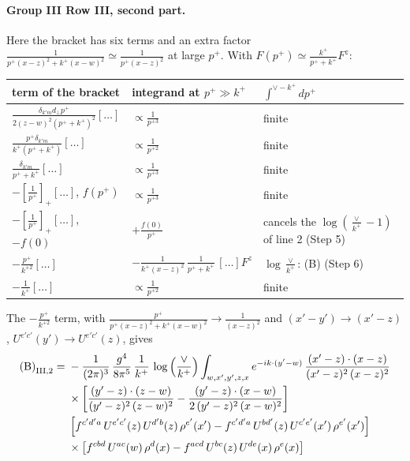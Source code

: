 \documentclass[10pt]{article}
\numberwithin{equation}{section}
\begin{document}
\paragraph{Group III Row III, second part.} Here the bracket has six terms and an extra factor $\frac{1}{p^{+}(x-z)^{2}+k^{+}(x-w)^{2}}\simeq\frac{1}{p^+(x-z)^2}$ at large $p^+$. With $F(p^+)\simeq\frac{k^+}{p^++k^+}F^z$:
\begin{center}
\renewcommand{\arraystretch}{1.5}
\begin{tabular}{lll}
\toprule
term of the bracket & integrand at $p^+\gg k^+$ & $\int^{\vee-k^+}dp^+$\\\midrule
$\frac{\delta_{k'm}d_\perp p^+}{2(z-w)^2(p^++k^+)^2}[\dots]$ & $\propto\frac{1}{p^{+3}}$ & finite\\
$\frac{p^+\delta_{k'm}}{k^+(p^++k^+)}[\dots]$ & $\propto\frac{1}{p^{+2}}$ & finite\\
$\frac{\delta_{k'm}}{p^++k^+}[\dots]$ & $\propto\frac{1}{p^{+3}}$ & finite\\
$-[\frac{1}{p^+}]_+[\dots]$, $f(p^+)$ & $\propto\frac{1}{p^{+3}}$ & finite\\
$-[\frac{1}{p^+}]_+[\dots]$, $-f(0)$ & $+\frac{f(0)}{p^+}$ & cancels the $\log(\frac{\vee}{k^+}-1)$ of line 2 (Step 5)\\
$-\frac{p^+}{k^{+2}}[\dots]$ & $-\frac{1}{k^+(x-z)^2}\,\frac{1}{p^++k^+}\,[\dots]F^z$ & $\log\frac{\vee}{k^+}$: (B) (Step 6)\\
$-\frac{1}{k^+}[\dots]$ & $\propto\frac{1}{p^{+2}}$ & finite\\\bottomrule
\end{tabular}
\end{center}
The $-\frac{p^+}{k^{+2}}$ term, with $\frac{p^+}{p^+(x-z)^2+k^+(x-w)^2}\to\frac{1}{(x-z)^2}$ and $(x'-y')\to(x'-z)$, $U^{e'c'}(y')\to U^{e'c'}(z)$, gives
\begin{align}
\text{(B)}_{\rm III,2}={}&-\frac{1}{(2\pi)^{3}}\,\frac{g^{4}}{8\pi^{5}}\,\frac{1}{k^{+}}\,\log{\left(\frac{\vee}{k^{+}}\right)}\int_{w,x',y',z,x} e^{-ik\cdot (y'-w)}\,\frac{(x'-z)\cdot (x-z)}{(x'-z)^{2}\,(x-z)^{2}}\notag \\
& \times\bigg[\frac{(y'-z)\cdot (z-w)}{(y'-z)^{2}\,(z-w)^{2}}-\frac{(y'-z)\cdot (x-w)}{2\,(y'-z)^{2}\,(x-w)^{2}}\bigg]\notag \\
& \left[f^{c'd'a}\,U^{e'c'}(z)\,U^{d'b}(z)\,\rho^{e'}(x')-f^{c'd'a}\, U^{bd'}(z)\,U^{c'e'}(x')\,\rho^{e'}(x')\right]\notag \\
& \times\left[f^{cbd}\,U^{ac}(w)\,\rho^{d}(x) -f^{acd}\,U^{bc}(z)\,U^{de}(x)\,\rho^{e}(x)\right] \label{eq:BIII,2}
\end{align}
\end{document}

